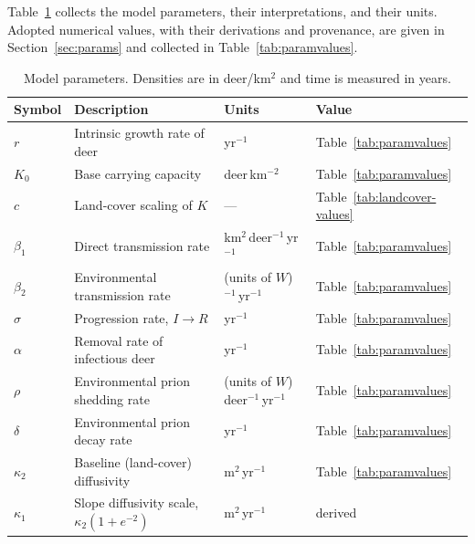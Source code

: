 \documentclass[11pt]{article}
\begin{document}
Table~\ref{tab:params} collects the model parameters, their interpretations, and their units. Adopted numerical values, with their derivations and provenance, are given in Section~\ref{sec:params} and collected in Table~\ref{tab:paramvalues}.

\begin{table}[h]
\centering
\caption{Model parameters. Densities are in deer/km$^2$ and time is measured in years.}
\label{tab:params}
\begin{tabular}{@{}llll@{}}
\toprule
Symbol & Description & Units & Value \\
\midrule
$r$        & Intrinsic growth rate of deer                 & yr$^{-1}$                        & Table~\ref{tab:paramvalues} \\
$K_0$      & Base carrying capacity                        & deer\,km$^{-2}$                  & Table~\ref{tab:paramvalues} \\
$c$        & Land-cover scaling of $K$                     & ---                              & Table~\ref{tab:landcover-values} \\
$\beta_1$  & Direct transmission rate                      & km$^{2}$\,deer$^{-1}$\,yr$^{-1}$ & Table~\ref{tab:paramvalues} \\
$\beta_2$  & Environmental transmission rate               & (units of $W$)$^{-1}$\,yr$^{-1}$ & Table~\ref{tab:paramvalues} \\
$\sigma$   & Progression rate, $I \to R$                   & yr$^{-1}$                        & Table~\ref{tab:paramvalues} \\
$\alpha$   & Removal rate of infectious deer               & yr$^{-1}$                        & Table~\ref{tab:paramvalues} \\
$\rho$     & Environmental prion shedding rate             & (units of $W$)\,deer$^{-1}$\,yr$^{-1}$ & Table~\ref{tab:paramvalues} \\
$\delta$   & Environmental prion decay rate                & yr$^{-1}$                        & Table~\ref{tab:paramvalues} \\
$\kappa_2$ & Baseline (land-cover) diffusivity             & m$^{2}$\,yr$^{-1}$              & Table~\ref{tab:paramvalues} \\
$\kappa_1$ & Slope diffusivity scale, $\kappa_2(1+e^{-2})$ & m$^{2}$\,yr$^{-1}$              & derived \\
\bottomrule
\end{tabular}
\end{table}
\end{document}
